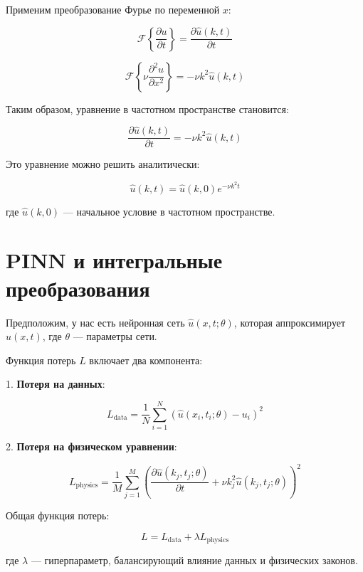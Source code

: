 \documentclass[a4paper,12pt]{article}
\theoremstyle{plain} %
\theoremstyle{definition} %
\theoremstyle{remark} %
\begin{document}
Применим преобразование Фурье по переменной \( x \):

\[
\mathcal{F}\left\{ \frac{\partial u}{\partial t} \right\} = \frac{\partial \hat{u}(k, t)}{\partial t}
\]

\[
\mathcal{F}\left\{ \nu \frac{\partial^2 u}{\partial x^2} \right\} = -\nu k^2 \hat{u}(k, t)
\]

Таким образом, уравнение в частотном пространстве становится:

\[
\frac{\partial \hat{u}(k, t)}{\partial t} = -\nu k^2 \hat{u}(k, t)
\]

Это уравнение можно решить аналитически:

\[
\hat{u}(k, t) = \hat{u}(k, 0) e^{-\nu k^2 t}
\]

где \( \hat{u}(k, 0) \) — начальное условие в частотном пространстве.

\section{PINN и интегральные преобразования}

Предположим, у нас есть нейронная сеть \( \hat{u}(x, t; \theta) \), которая аппроксимирует \( u(x, t) \), где \( \theta \) — параметры сети.

Функция потерь \( L \) включает два компонента:

1. \textbf{Потеря на данных}:

\[
L_{\text{data}} = \frac{1}{N} \sum_{i=1}^N \left( \hat{u}(x_i, t_i; \theta) - u_i \right)^2
\]

2. \textbf{Потеря на физическом уравнении}:

\[
L_{\text{physics}} = \frac{1}{M} \sum_{j=1}^M \left( \frac{\partial \hat{u}(k_j, t_j; \theta)}{\partial t} + \nu k_j^2 \hat{u}(k_j, t_j; \theta) \right)^2
\]

Общая функция потерь:

\[
L = L_{\text{data}} + \lambda L_{\text{physics}}
\]

где \( \lambda \) — гиперпараметр, балансирующий влияние данных и физических законов.
\end{document}
